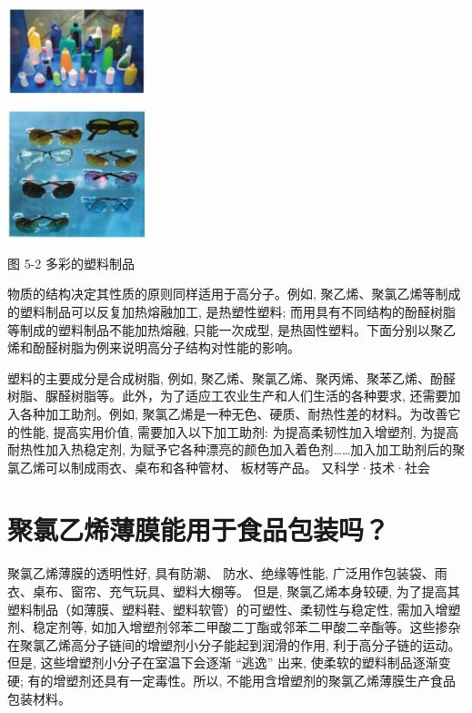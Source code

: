 \documentclass[10pt]{article}
\begin{document}
\begin{center}
\includegraphics[max width=0.3\textwidth]{images/0190efc5-b58a-7c43-bfb0-e0a030df9cfd_141_873020.jpg}
\end{center}

\begin{center}
\includegraphics[max width=0.3\textwidth]{images/0190efc5-b58a-7c43-bfb0-e0a030df9cfd_141_867771.jpg}
\end{center}

图 5-2 多彩的塑料制品

物质的结构决定其性质的原则同样适用于高分子。例如, 聚乙烯、聚氯乙烯等制成的塑料制品可以反复加热熔融加工, 是热塑性塑料; 而用具有不同结构的酚醛树脂等制成的塑料制品不能加热熔融, 只能一次成型, 是热固性塑料。下面分别以聚乙烯和酚醛树脂为例来说明高分子结构对性能的影响。

塑料的主要成分是合成树脂, 例如, 聚乙烯、聚氯乙烯、聚丙烯、聚苯乙烯、酚醛树脂、脲醛树脂等。此外，为了适应工农业生产和人们生活的各种要求, 还需要加入各种加工助剂。例如, 聚氯乙烯是一种无色、硬质、耐热性差的材料。为改善它的性能, 提高实用价值, 需要加入以下加工助剂: 为提高柔韧性加入增塑剂, 为提高耐热性加入热稳定剂, 为赋予它各种漂亮的颜色加入着色剂……加入加工助剂后的聚氯乙烯可以制成雨衣、桌布和各种管材、 板材等产品。 又科学·技术·社会

\section*{聚氯乙烯薄膜能用于食品包装吗？}

聚氯乙烯薄膜的透明性好, 具有防潮、 防水、绝缘等性能, 广泛用作包装袋、雨衣、桌布、窗帘、充气玩具、塑料大棚等。 但是, 聚氯乙烯本身较硬, 为了提高其塑料制品（如薄膜、塑料鞋、塑料软管）的可塑性、柔韧性与稳定性, 需加入增塑剂、稳定剂等, 如加入增塑剂邻苯二甲酸二丁酯或邻苯二甲酸二辛酯等。这些掺杂在聚氯乙烯高分子链间的增塑剂小分子能起到润滑的作用, 利于高分子链的运动。但是, 这些增塑剂小分子在室温下会逐渐 “逃逸” 出来, 使柔软的塑料制品逐渐变硬; 有的增塑剂还具有一定毒性。所以, 不能用含增塑剂的聚氯乙烯薄膜生产食品包装材料。
\end{document}
